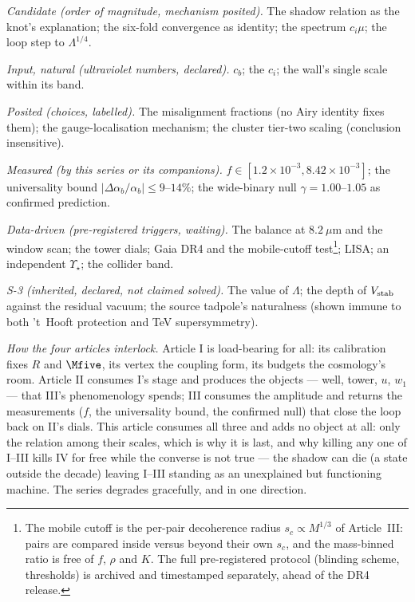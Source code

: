 \emph{Candidate (order of magnitude, mechanism posited).} The shadow relation as the knot's explanation; the six-fold convergence as identity; the spectrum $c_{i}\mu$; the loop step to $\Lambda^{1/4}$.

\emph{Input, natural (ultraviolet numbers, declared).} $c_{b}$; the $c_{i}$; the wall's single scale within its band.

\emph{Posited (choices, labelled).} The misalignment fractions (no Airy identity fixes them); the gauge-localisation mechanism; the cluster tier-two scaling (conclusion insensitive).

\emph{Measured (by this series or its companions).} $f\in[1.2\times10^{-3},8.42\times10^{-3}]$; the universality bound $|\Delta\alpha_{b}/\alpha_{b}|\leq9$--$14\%$; the wide-binary null $\gamma=1.00$--$1.05$ as confirmed prediction.

\emph{Data-driven (pre-registered triggers, waiting).} The balance at $8.2~\mu$m and the window scan; the tower dials; Gaia DR4 and the mobile-cutoff test\footnote{The mobile cutoff is the per-pair decoherence radius $s_{c}\propto M^{1/3}$ of Article~III: pairs are compared inside versus beyond their own $s_{c}$, and the mass-binned ratio is free of $f$, $\rho$ and $K$. The full pre-registered protocol (blinding scheme, thresholds) is archived and timestamped separately, ahead of the DR4 release.}; LISA; an independent $\Upsilon_{\star}$; the collider band.

\emph{S-3 (inherited, declared, not claimed solved).} The value of $\Lambda$; the depth of $V_{\rm stab}$ against the residual vacuum; the source tadpole's naturalness (shown immune to both 't~Hooft protection and TeV supersymmetry).

\emph{How the four articles interlock.} Article I is load-bearing for all: its calibration fixes $R$ and $\Mfive$, its vertex the coupling form, its budgets the cosmology's room. Article II consumes I's stage and produces the objects --- well, tower, $u$, $w_{1}$ --- that III's phenomenology spends; III consumes the amplitude and returns the measurements ($f$, the universality bound, the confirmed null) that close the loop back on II's dials. This article consumes all three and adds no object at all: only the relation among their scales, which is why it is last, and why killing any one of I--III kills IV for free while the converse is not true --- the shadow can die (a state outside the decade) leaving I--III standing as an unexplained but functioning machine. The series degrades gracefully, and in one direction.

